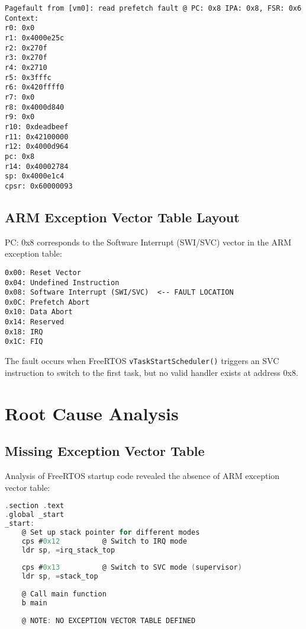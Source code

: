 \documentclass[11pt,a4paper]{article}
\begin{document}
\begin{lstlisting}[caption=Original FreeRTOS Pagefault Error]
Pagefault from [vm0]: read prefetch fault @ PC: 0x8 IPA: 0x8, FSR: 0x6
Context:
r0: 0x0
r1: 0x4000e25c
r2: 0x270f
r3: 0x270f
r4: 0x2710
r5: 0x3fffc
r6: 0x420ffff0
r7: 0x0
r8: 0x4000d840
r9: 0x0
r10: 0xdeadbeef
r11: 0x42100000
r12: 0x4000d964
pc: 0x8
r14: 0x40002784
sp: 0x4000e1c4
cpsr: 0x60000093
\end{lstlisting}

\subsection{ARM Exception Vector Table Layout}

PC: 0x8 corresponds to the Software Interrupt (SWI/SVC) vector in the ARM exception table:

\begin{lstlisting}[caption=ARM Exception Vector Table Layout]
0x00: Reset Vector
0x04: Undefined Instruction
0x08: Software Interrupt (SWI/SVC)  <-- FAULT LOCATION
0x0C: Prefetch Abort
0x10: Data Abort
0x14: Reserved
0x18: IRQ
0x1C: FIQ
\end{lstlisting}

The fault occurs when FreeRTOS \texttt{vTaskStartScheduler()} triggers an SVC instruction to switch to the first task, but no valid handler exists at address 0x8.

\section{Root Cause Analysis}

\subsection{Missing Exception Vector Table}

Analysis of FreeRTOS startup code revealed the absence of ARM exception vector table:

\begin{lstlisting}[language=C,caption=FreeRTOS Startup Code (startup.S)]
.section .text
.global _start
_start:
    @ Set up stack pointer for different modes
    cps #0x12          @ Switch to IRQ mode
    ldr sp, =irq_stack_top
    
    cps #0x13          @ Switch to SVC mode (supervisor)
    ldr sp, =stack_top
    
    @ Call main function
    b main
    
    @ NOTE: NO EXCEPTION VECTOR TABLE DEFINED
\end{lstlisting}
\end{document}
